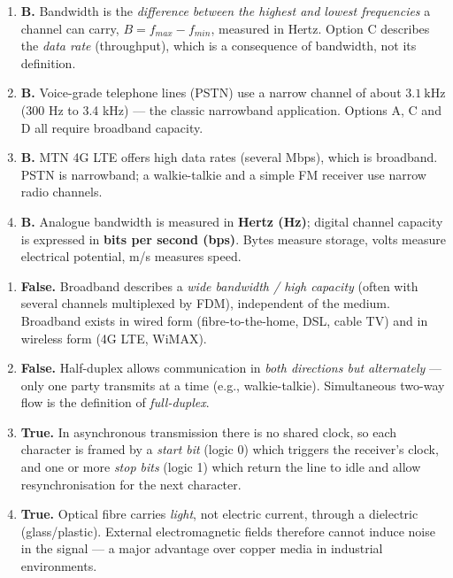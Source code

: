 \documentclass[11pt]{article}
\newcounter{popsec}
\newcounter{popsub}
\newcommand{\courssub}[1]{%
  \stepcounter{popsub}%
  \par\vspace{9pt}\noindent{\popxbold\fontsize{11.5}{13}\selectfont\color{popink}{\color{poporange}\thepopsec.\thepopsub}\hspace{6pt}#1}\par\nopagebreak\vspace{4pt}
}
\begin{document}
\courssub{I check my knowledge}

\begin{corrige}
\begin{enumerate}
\item \textbf{B.} Bandwidth is the \emph{difference between the highest and lowest frequencies} a channel can carry, $B = f_{max} - f_{min}$, measured in Hertz. Option C describes the \emph{data rate} (throughput), which is a consequence of bandwidth, not its definition.
\item \textbf{B.} Voice-grade telephone lines (PSTN) use a narrow channel of about $3.1\ \mathrm{kHz}$ (300 Hz to 3.4 kHz) — the classic narrowband application. Options A, C and D all require broadband capacity.
\item \textbf{B.} MTN 4G LTE offers high data rates (several Mbps), which is broadband. PSTN is narrowband; a walkie-talkie and a simple FM receiver use narrow radio channels.
\item \textbf{B.} Analogue bandwidth is measured in \textbf{Hertz (Hz)}; digital channel capacity is expressed in \textbf{bits per second (bps)}. Bytes measure storage, volts measure electrical potential, m/s measures speed.
\end{enumerate}
\end{corrige}

\begin{corrige}
\begin{enumerate}
\item \textbf{False.} Broadband describes a \emph{wide bandwidth / high capacity} (often with several channels multiplexed by FDM), independent of the medium. Broadband exists in wired form (fibre-to-the-home, DSL, cable TV) and in wireless form (4G LTE, WiMAX).
\item \textbf{False.} Half-duplex allows communication in \emph{both directions but alternately} — only one party transmits at a time (e.g., walkie-talkie). Simultaneous two-way flow is the definition of \emph{full-duplex}.
\item \textbf{True.} In asynchronous transmission there is no shared clock, so each character is framed by a \emph{start bit} (logic 0) which triggers the receiver's clock, and one or more \emph{stop bits} (logic 1) which return the line to idle and allow resynchronisation for the next character.
\item \textbf{True.} Optical fibre carries \emph{light}, not electric current, through a dielectric (glass/plastic). External electromagnetic fields therefore cannot induce noise in the signal — a major advantage over copper media in industrial environments.
\end{enumerate}
\end{corrige}
\end{document}
